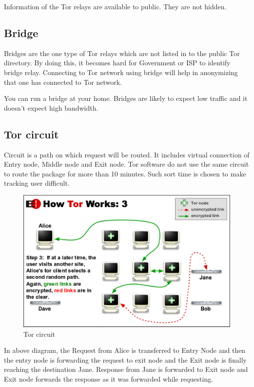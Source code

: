 \documentclass{article}
\begin{document}
      Information of the Tor relays are available to public. They are not
      hidden.

    \subsection{Bridge}
      Bridges are the one type of Tor relays which are not listed in to the
      public Tor directory. By doing this, it becomes hard for Government or
      ISP to identify bridge relay. Connecting to Tor network using bridge will
      help in anonymizing that one has connected to Tor network.

      You can run a bridge at your home. Bridges are likely to expect low
      traffic and it doesn't expect high bandwidth.

    \subsection{Tor circuit}
      Circuit is a path on which request will be routed. It includes virtual
      connection of Entry node, Middle node and Exit node. Tor software do not
      use the same circuit to route the package for more than 10 minutes. Such
      sort time is chosen to make tracking user difficult.

      \begin{figure}[h!]
        \includegraphics[width=\linewidth]{tor_circuit.png}
        \caption{Tor circuit}
        \label{fig:tor_circuit}
      \end{figure}

      In above diagram, the Request from Alice is transferred to Entry Node and
      then the entry node is forwarding the request to exit node and the Exit
      node is finally reaching the destination Jane. Response from Jane is
      forwarded to Exit node and Exit node forwards the response as it was
      forwarded while requesting.
\end{document}
